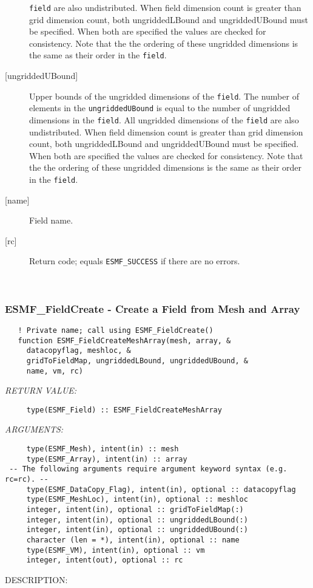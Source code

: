 \begin{description}
   {\tt field} are also undistributed. When field dimension count is
   greater than grid dimension count, both ungriddedLBound and ungriddedUBound
   must be specified. When both are specified the values are checked
   for consistency. Note that the the ordering of
   these ungridded dimensions is the same as their order in the {\tt field}.
   \item [{[ungriddedUBound]}]
   Upper bounds of the ungridded dimensions of the {\tt field}.
   The number of elements in the {\tt ungriddedUBound} is equal to the number of ungridded
   dimensions in the {\tt field}. All ungridded dimensions of the
   {\tt field} are also undistributed. When field dimension count is
   greater than grid dimension count, both ungriddedLBound and ungriddedUBound
   must be specified. When both are specified the values are checked
   for consistency. Note that the the ordering of
   these ungridded dimensions is the same as their order in the {\tt field}.
   \item [{[name]}]
   Field name.
   \item [{[rc]}]
   Return code; equals {\tt ESMF\_SUCCESS} if there are no errors.
   \end{description} 
 
\mbox{}\hrulefill\ 
 
\subsubsection [ESMF\_FieldCreate] {ESMF\_FieldCreate - Create a Field from Mesh and Array}


\begin{verbatim}   ! Private name; call using ESMF_FieldCreate()
   function ESMF_FieldCreateMeshArray(mesh, array, &
     datacopyflag, meshloc, &
     gridToFieldMap, ungriddedLBound, ungriddedUBound, &
     name, vm, rc)\end{verbatim}{\em RETURN VALUE:}
\begin{verbatim}     type(ESMF_Field) :: ESMF_FieldCreateMeshArray\end{verbatim}{\em ARGUMENTS:}
\begin{verbatim}     type(ESMF_Mesh), intent(in) :: mesh
     type(ESMF_Array), intent(in) :: array
 -- The following arguments require argument keyword syntax (e.g. rc=rc). --
     type(ESMF_DataCopy_Flag), intent(in), optional :: datacopyflag
     type(ESMF_MeshLoc), intent(in), optional :: meshloc
     integer, intent(in), optional :: gridToFieldMap(:)
     integer, intent(in), optional :: ungriddedLBound(:)
     integer, intent(in), optional :: ungriddedUBound(:)
     character (len = *), intent(in), optional :: name
     type(ESMF_VM), intent(in), optional :: vm
     integer, intent(out), optional :: rc\end{verbatim}
{\sf DESCRIPTION:\\ }


